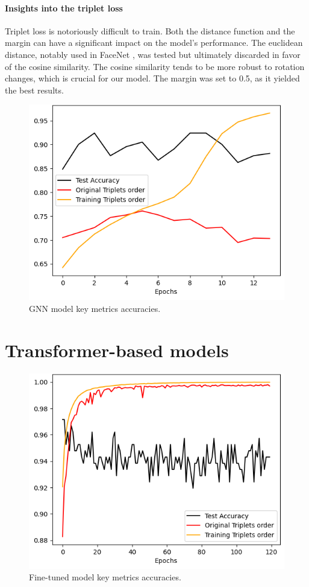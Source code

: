 \paragraph{Insights into the triplet loss}

Triplet loss is notoriously difficult to train. Both the distance function and the margin can have a significant impact on the model's performance. The euclidean distance, notably used in FaceNet \cite{schroffFaceNetUnifiedEmbedding2015}, was tested but ultimately discarded in favor of the cosine similarity. The cosine similarity tends to be more robust to rotation changes, which is crucial for our model. The margin was set to 0.5, as it yielded the best results.

\label{sec:graph-based-models}
\begin{figure}[]
    \centering
    \includegraphics[width=0.5\columnwidth]{images/key_metrics_evolution_gnn.png}
    \caption{GNN model key metrics accuracies.}
    \label{fig:key_metrics_evolution_gnn}
\end{figure}


\section{Transformer-based models}
\label{sec:transformer-based-models}

\begin{figure}[]
    \centering
    \includegraphics[width=0.5\columnwidth]{images/key_metrics_evolution_openshape.png}
    \caption{Fine-tuned model key metrics accuracies.}
    \label{fig:key_metrics_evolution_openshape}
\end{figure}

